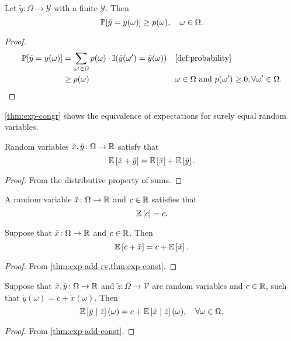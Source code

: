 \begin{lemma} \label{lem:prob-ge-measure}
  Let $\tilde{y}\colon \Omega \to \mathcal{Y}$ with a finite $\mathcal{Y}$. Then
  \[
   \mathbb{P}[\tilde{y} = y(\omega)] \ge p(\omega ), \quad \omega \in \Omega . 
  \]
\end{lemma}
\begin{proof}
 \begin{align*}
   \PP[\tilde{y} = y(\omega)]
   &= \sum_{\omega' \in \Omega } p(\omega) \cdot \I(\tilde{y}(\omega') = \tilde{y}(\omega)) && \text{\cref{def:probability}} \\
   &\ge p(\omega ) && \omega \in \Omega \text{ and } p(\omega') \ge 0, \forall \omega '\in \Omega. 
 \end{align*}
\end{proof}


\begin{remark}
\cref{thm:exp-congr} shows the equivalence of expectations for surely equal random variables. 
\end{remark}

\begin{theorem} \label{thm:exp-add-rv}
  Random variables $\tilde{x}, \tilde{y} \colon \Omega \to \mathbb{R}$ satisfy that
  \[
    \mathbb{E} \left[ \tilde{x} + \tilde{y} \right]
    =
    \mathbb{E} \left[ \tilde{x} \right] + \mathbb{E} \left[ \tilde{y} \right].
  \]
\end{theorem}
\begin{proof}
  From the distributive property of sums. 
\end{proof}

\begin{theorem} \label{thm:exp-const}
  A random variable $\tilde{x}\colon \Omega \to \mathbb{R}$ and $c\in \mathbb{R} $ satisfies that
  \[
   \mathbb{E} \left[ c \right] = c.
  \]
\end{theorem}


\begin{theorem} \label{thm:exp-add-const}
Suppose that $\tilde{x} \colon \Omega \to \mathbb{R}$ and $c\in \mathbb{R}$. Then
\[
\mathbb{E} \left[ c + \tilde{x} \right] = c + \mathbb{E} \left[ \tilde{x} \right].
\]
\end{theorem}
\begin{proof}
  From \cref{thm:exp-add-rv,thm:exp-const}.
\end{proof}


\begin{theorem} \label{thm:exp-cnd-rv-add-const}
Suppose that $\tilde{x}, \tilde{y} \colon \Omega \to \mathbb{R}$ and $\tilde{z}\colon \Omega \to \mathcal{V}$ are random variables and $c\in \mathbb{R}$, such that $\tilde{y}(\omega) = c + \tilde{x}(\omega)$. Then
\[
\mathbb{E} \left[ \tilde{y} \mid \tilde{z} \right](\omega) = c + \mathbb{E} \left[ \tilde{x} \mid  \tilde{z} \right](\omega), \quad \forall \omega \in \Omega.
\]
\end{theorem}
\begin{proof}
From \cref{thm:exp-add-const}.
\end{proof}

